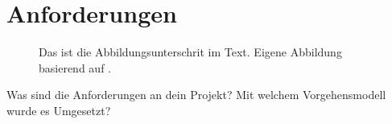 \section{Anforderungen} \label{sec:anforderungen}

\begin{figure}[H]
    \centering 
    
    \caption[Das steht im Abbildungsverzeichnis.]{Das ist die Abbildungsunterschrit im Text. Eigene Abbildung basierend auf \cite{projektmanagement}.}
    \label{fig:wasserfallmodell}
\end{figure}

Was sind die Anforderungen an dein Projekt? Mit welchem Vorgehensmodell wurde es Umgesetzt?
